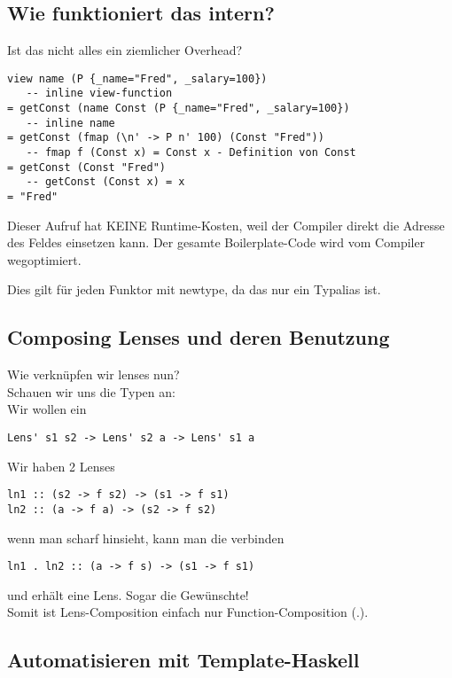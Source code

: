 \documentclass{beamer}
\begin{document}
\subsection{Wie funktioniert das intern?}
\begin{frame}[fragile]
Ist das nicht alles ein ziemlicher Overhead?
\pause

\begin{verbatim}
view name (P {_name="Fred", _salary=100})
   -- inline view-function
= getConst (name Const (P {_name="Fred", _salary=100})
   -- inline name
= getConst (fmap (\n' -> P n' 100) (Const "Fred"))
   -- fmap f (Const x) = Const x - Definition von Const
= getConst (Const "Fred")
   -- getConst (Const x) = x
= "Fred"
\end{verbatim}
\pause
Dieser Aufruf hat KEINE Runtime-Kosten, weil der Compiler direkt die
Adresse des Feldes einsetzen kann. Der gesamte Boilerplate-Code wird vom
Compiler wegoptimiert.

Dies gilt für jeden Funktor mit newtype, da das nur ein Typalias ist.
\end{frame}

\subsection{Composing Lenses und deren Benutzung}

\begin{frame}[fragile]
Wie verknüpfen wir lenses nun?\\
\pause
Schauen wir uns die Typen an:\\
Wir wollen ein
\begin{verbatim}
Lens' s1 s2 -> Lens' s2 a -> Lens' s1 a
\end{verbatim}
\pause
Wir haben 2 Lenses
\begin{verbatim}
ln1 :: (s2 -> f s2) -> (s1 -> f s1)
ln2 :: (a -> f a) -> (s2 -> f s2)
\end{verbatim}
\pause
wenn man scharf hinsieht, kann man die verbinden
\begin{verbatim}
ln1 . ln2 :: (a -> f s) -> (s1 -> f s1)
\end{verbatim}
\pause
und erhält eine Lens. Sogar die Gewünschte!\\Somit ist Lens-Composition
einfach nur Function-Composition (.).
\end{frame}

\subsection{Automatisieren mit Template-Haskell}
\end{document}

